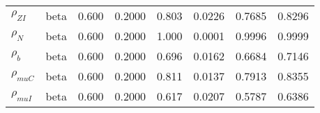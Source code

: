 \begin{center}
\begin{longtable}{llcccccc}
${\rho_{ZI}}$ & beta &   0.600 & 0.2000 &   0.803& 0.0226 &  0.7685 &  0.8296 \\ 
${\rho_N}$ & beta &   0.600 & 0.2000 &   1.000& 0.0001 &  0.9996 &  0.9999 \\ 
${\rho_b}$ & beta &   0.600 & 0.2000 &   0.696& 0.0162 &  0.6684 &  0.7146 \\ 
${\rho_{muC}}$ & beta &   0.600 & 0.2000 &   0.811& 0.0137 &  0.7913 &  0.8355 \\ 
${\rho_{muI}}$ & beta &   0.600 & 0.2000 &   0.617& 0.0207 &  0.5787 &  0.6386 \\ 
\end{longtable}
 \end{center}
